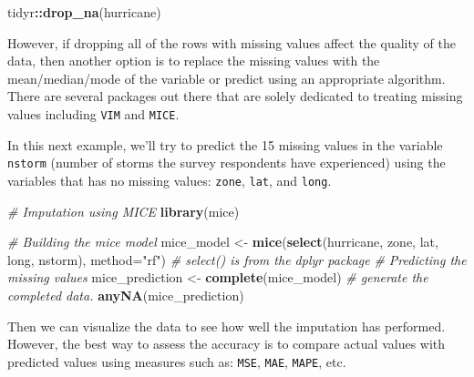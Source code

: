 \documentclass[
]{book}
\newenvironment{Shaded}{\begin{snugshade}}{\end{snugshade}}
\newcommand{\CommentTok}[1]{\textcolor[rgb]{0.56,0.35,0.01}{\textit{#1}}}
\newcommand{\DataTypeTok}[1]{\textcolor[rgb]{0.13,0.29,0.53}{#1}}
\newcommand{\KeywordTok}[1]{\textcolor[rgb]{0.13,0.29,0.53}{\textbf{#1}}}
\newcommand{\NormalTok}[1]{#1}
\newcommand{\OperatorTok}[1]{\textcolor[rgb]{0.81,0.36,0.00}{\textbf{#1}}}
\newcommand{\StringTok}[1]{\textcolor[rgb]{0.31,0.60,0.02}{#1}}
\begin{document}
\begin{Shaded}
\begin{Highlighting}[]
\NormalTok{tidyr}\OperatorTok{::}\KeywordTok{drop\_na}\NormalTok{(hurricane)}
\end{Highlighting}
\end{Shaded}

However, if dropping all of the rows with missing values affect the quality of the data, then another option is to replace the missing values with the mean/median/mode of the variable or predict using an appropriate algorithm. There are several packages out there that are solely dedicated to treating missing values including \texttt{VIM} and \texttt{MICE}.

In this next example, we'll try to predict the 15 missing values in the variable \texttt{nstorm} (number of storms the survey respondents have experienced) using the variables that has no missing values: \texttt{zone}, \texttt{lat}, and \texttt{long}.

\begin{Shaded}
\begin{Highlighting}[]
\CommentTok{\# Imputation using MICE}
\KeywordTok{library}\NormalTok{(mice)}

\CommentTok{\# Building the mice model}
\NormalTok{mice\_model \textless{}{-}}\StringTok{ }\KeywordTok{mice}\NormalTok{(}\KeywordTok{select}\NormalTok{(hurricane, zone, lat, long, nstorm), }\DataTypeTok{method=}\StringTok{"rf"}\NormalTok{) }\CommentTok{\# select() is from the dplyr package}
\CommentTok{\# Predicting the missing values}
\NormalTok{mice\_prediction \textless{}{-}}\StringTok{ }\KeywordTok{complete}\NormalTok{(mice\_model)  }\CommentTok{\# generate the completed data.}
\KeywordTok{anyNA}\NormalTok{(mice\_prediction)}
\end{Highlighting}
\end{Shaded}

Then we can visualize the data to see how well the imputation has performed. However, the best way to assess the accuracy is to compare actual values with predicted values using measures such as: \texttt{MSE}, \texttt{MAE}, \texttt{MAPE}, etc.
\end{document}

